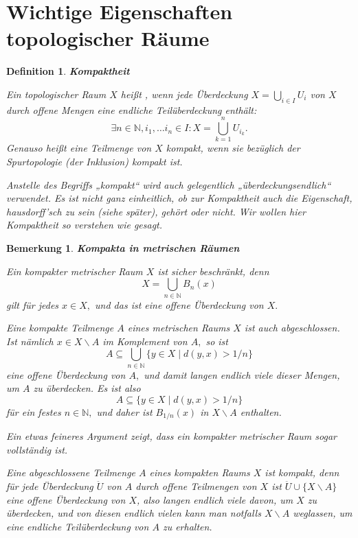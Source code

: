 \documentclass[12pt]{book}   %
\newtheorem{bem}[alles]{Bemerkung}
\newtheorem{defini}[alles]{Definition}
\begin{document}
\section{Wichtige Eigenschaften topologischer Räume}
\begin{defini} {\bf Kompaktheit}

{\rm Ein topologischer Raum $X$ heißt , wenn
jede Überdeckung $X=\bigcup_{i\in I}U_i$ von $X$ durch offene Mengen eine
endliche Teilüberdeckung enthält: 
$$\exists n\in \mathbb N, i_1,\dots i_n\in I: X=\bigcup_{k=1}^n U_{i_k}.$$
Genauso heißt eine Teilmenge von $X$ kompakt, wenn sie bezüglich der 
Spurtopologie (der Inklusion) kompakt ist.

Anstelle des Begriffs „kompakt“ wird auch gelegentlich 
„überdeckungsendlich“ verwendet. Es ist nicht ganz einheitlich, ob 
zur Kompaktheit auch die Eigenschaft, hausdorff'sch zu sein (siehe später), 
gehört oder 
nicht. Wir wollen hier Kompaktheit so verstehen wie gesagt.
}
\end{defini}
\begin{bem} {\bf Kompakta in metrischen Räumen}

{\rm Ein kompakter metrischer Raum $X$ ist sicher beschränkt, denn 
$$X=\bigcup_{n\in \mathbb N} B_n(x)$$
gilt für jedes $x\in X,$ und das ist eine offene Überdeckung von $X.$

Eine kompakte Teilmenge $A$ eines metrischen Raums $X$ ist 
auch abgeschlossen. Ist nämlich $x\in X\smallsetminus A$ im Komplement von 
$A,$ so ist 
$$A\subseteq \bigcup_{n\in \mathbb N} \{y\in X\mid d(y,x)> 1/n \}$$
eine offene Überdeckung von $A,$ und damit langen endlich viele dieser
Mengen, um $A$ zu überdecken. Es ist also 
$$A\subseteq \{y\in X\mid d(y,x)> 1/n \}$$
für ein festes $n\in \mathbb N,$ und daher ist $B_{1/n}(x)$ in 
$X\smallsetminus A$ enthalten.

Ein etwas feineres Argument zeigt, dass ein kompakter metrischer Raum sogar
vollständig ist.

Eine abgeschlossene Teilmenge $A$ eines kompakten Raums $X$ ist kompakt, denn
für jede Überdeckung $\ddot U$ von $A$ durch offene Teilmengen von $X$ 
ist $\ddot U\cup\{X\smallsetminus A\}$ eine offene Überdeckung von $X$, also
langen endlich viele davon, um $X$ zu überdecken, und von diesen endlich
vielen kann man notfalls $X\smallsetminus A$ weglassen, um eine endliche 
Teilüberdeckung von $A$ zu erhalten.


}

\end{bem}
\end{document}
